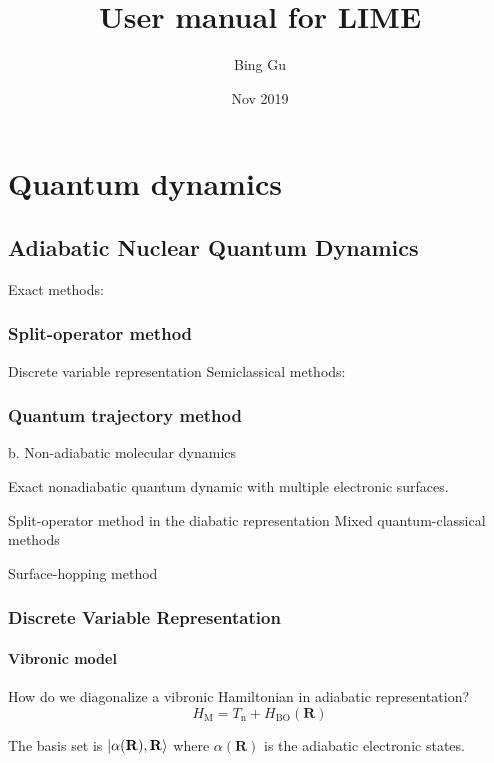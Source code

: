 \documentclass[a4paper,12pt]{book}
\newcommand{\be}{\begin{equation}}
\newcommand{\ee}{\end{equation}}
\renewcommand{\bf}{\mathbf}
\renewcommand{\bf}{\mathbf}
\begin{document}
\author{Bing Gu}
\title{User manual for LIME} 
\date{Nov 2019}

\frontmatter
\maketitle
\tableofcontents

\mainmatter
%
%




\chapter{Quantum dynamics} 

\section{ Adiabatic Nuclear Quantum Dynamics}

Exact methods:

\subsection{Split-operator method} 
Discrete variable representation
Semiclassical methods:

\subsection{Quantum trajectory method} 
b. Non-adiabatic molecular dynamics

Exact nonadiabatic quantum dynamic with multiple electronic surfaces.

Split-operator method in the diabatic representation
Mixed quantum-classical methods

Surface-hopping method

\subsection{Discrete Variable Representation}
\subsubsection{Vibronic model}
How do we diagonalize a vibronic Hamiltonian in adiabatic representation?
\be H_\text{M} = T_\text{n} + H_\text{BO}(\bf R) \ee 

The basis set is $\ket{\alpha(\bf R), \bf R}$ where $\alpha(\bf R)$ is the adiabatic electronic states. 
\end{document}
